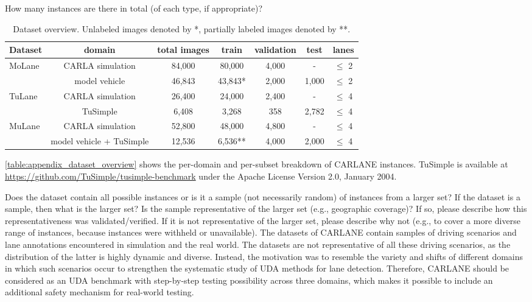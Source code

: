 \documentclass{article}
\begin{document}
	\begin{datasheetitem}{How many instances are there in total (of each type, if appropriate)?}
		\begin{table*}
			\caption{Dataset overview. Unlabeled images denoted by *, partially labeled images denoted by **.}
			\label{table:appendix_dataset_overview}
			\small
			\centering
			\begin{tabular}{lcccccc}
				\toprule
				Dataset                  & domain             & total images & train   & validation  & test  & lanes       \\ \midrule
				\multirow{2}{*}{MoLane}  & CARLA simulation   & 84,000       & 80,000  & 4,000       & -     & \(\leq\) 2  \\ 
				& model vehicle      & 46,843       & 43,843* & 2,000       & 1,000 & \(\leq\) 2  \\ \midrule
				\multirow{2}{*}{TuLane}  & CARLA simulation   & 26,400       & 24,000  & 2,400       & -     & \(\leq\) 4  \\ 
				& TuSimple & 6,408        & 3,268   & 358         & 2,782 & \(\leq\) 4  \\ \midrule
				\multirow{2}{*}{MuLane}  & CARLA simulation   & 52,800       & 48,000  & 4,800       & -     & \(\leq\) 4  \\ 
				& model vehicle + TuSimple & 12,536      & 6,536** & 4,000       & 2,000 & \(\leq\) 4  \\ 
				\bottomrule
			\end{tabular}
		\end{table*}
		\autoref{table:appendix_dataset_overview} shows the per-domain and per-subset breakdown of CARLANE instances. TuSimple is available at  \url{https://github.com/TuSimple/tusimple-benchmark} under the Apache License Version 2.0, January 2004. 
	\end{datasheetitem}
	\begin{datasheetitem}{Does the dataset contain all possible instances or is it a sample (not necessarily random) of instances from a larger set? \normalfont If the dataset is a sample, then what is the larger set? Is the sample representative of the larger set (e.g., geographic coverage)? If so, please describe how this representativeness was validated/verified. If it is not representative of the larger set, please describe why not (e.g., to cover a more diverse range of instances, because instances were withheld or unavailable).}
		The datasets of CARLANE contain samples of driving scenarios and lane annotations encountered in simulation and the real world. The datasets are not representative of all these driving scenarios, as the distribution of the latter is highly dynamic and diverse. Instead, the motivation was to resemble the variety and shifts of different domains in which such scenarios occur to strengthen the systematic study of UDA methods for lane detection. Therefore, CARLANE should be considered as an UDA benchmark with step-by-step testing possibility across three domains, which makes it possible to include an additional safety mechanism for real-world testing.
	\end{datasheetitem}
\end{document}
